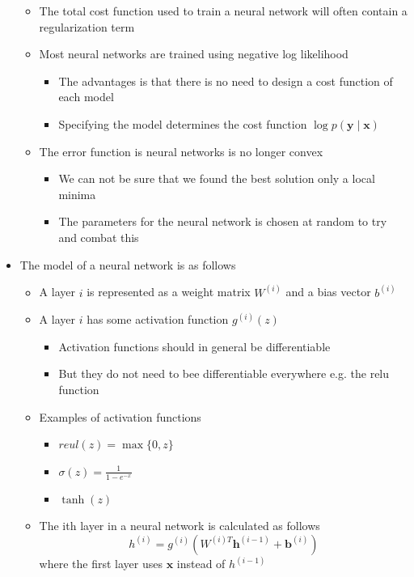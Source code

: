 \documentclass[a4, english]{article}
\begin{document}
\begin{itemize}
\begin{itemize}
    \item The total cost function used to train a neural network will often contain a regularization term 
    \item Most neural networks are trained using negative log likelihood
    \begin{itemize}
    	\item The advantages is that there is no need to design a cost function of each model 
      \item Specifying the model determines the cost function $\log p(\pmb y \mid \pmb x)$ 
    \end{itemize}
    \item The error function is neural networks is no longer convex
    \begin{itemize}
    	\item We can not be sure that we found the best solution only a local minima
      \item The parameters for the neural network is chosen at random to try and combat this 
    \end{itemize}
  \end{itemize}
  \item The model of a neural network is as follows 
  \begin{itemize}
  	\item A layer $i$ is represented as a weight matrix $W^{(i)}$ and a bias vector $b^{(i)}$  
    \item A layer $i$ has some activation function $g^{(i)}(z)$  
    \begin{itemize}
    	\item Activation functions should in general be differentiable
      \item But they do not need to bee differentiable everywhere e.g. the relu function  
    \end{itemize}
    \item Examples of activation functions
    \begin{itemize}
    	\item $reul(z) = \max\{0,z\}$
      \item $\sigma(z) = \frac1{1-e^{-x}} $
      \item $\tanh(z)$ 
    \end{itemize} 
    \item The ith layer in a neural network is calculated as follows
\begin{equation*}
  h^{(i)} = g^{(i)}(W ^{(i)T}\pmb h^{(i-1)} + \pmb b^{(i)})
\end{equation*}
  where the first layer uses $\pmb x$ instead of $h^{(i-1)}$  
  \end{itemize}
\end{itemize}
\end{document}
